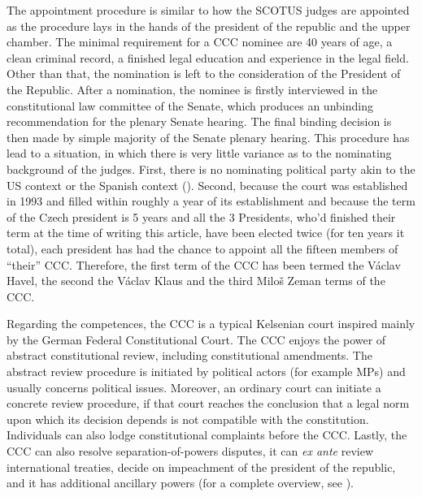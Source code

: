 \documentclass[
  11pt,
]{article}
\begin{document}
The appointment procedure is similar to how the SCOTUS judges are appointed as the procedure lays in the hands of the president of the republic and the upper chamber. The minimal requirement for a CCC nominee are 40 years of age, a clean criminal record, a finished legal education and experience in the legal field. Other than that, the nomination is left to the consideration of the President of the Republic. After a nomination, the nominee is firstly interviewed in the constitutional law committee of the Senate, which produces an unbinding recommendation for the plenary Senate hearing. The final binding decision is then made by simple majority of the Senate plenary hearing. This procedure has lead to a situation, in which there is very little variance as to the nominating background of the judges. First, there is no nominating political party akin to the US context or the Spanish context (). Second, because the court was established in 1993 and filled within roughly a year of its establishment and because the term of the Czech president is 5 years and all the 3 Presidents, who'd finished their term at the time of writing this article, have been elected twice (for ten years it total), each president has had the chance to appoint all the fifteen members of ``their'' CCC. Therefore, the first term of the CCC has been termed the Václav Havel, the second the Václav Klaus and the third Miloš Zeman terms of the CCC.

Regarding the competences, the CCC is a typical Kelsenian court inspired mainly by the German Federal Constitutional Court. The CCC enjoys the power of abstract constitutional review, including constitutional amendments. The abstract review procedure is initiated by political actors (for example MPs) and usually concerns political issues. Moreover, an ordinary court can initiate a concrete review procedure, if that court reaches the conclusion that a legal norm upon which its decision depends is not compatible with the constitution. Individuals can also lodge constitutional complaints before the CCC. Lastly, the CCC can also resolve separation-of-powers disputes, it can \emph{ex ante} review international treaties, decide on impeachment of the president of the republic, and it has additional ancillary powers (for a complete overview, see ).
\end{document}
